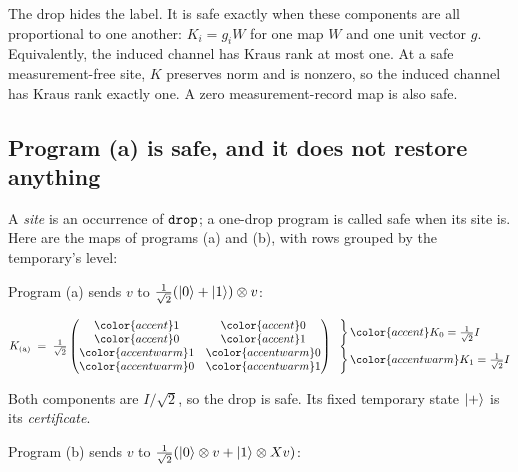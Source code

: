 \documentclass[acmsmall,screen,review,anonymous,nonacm]{acmart}
\begin{document}
The drop hides the label. It is safe exactly when these components are all
proportional to one another: $K_i=g_iW$ for one map $W$ and one unit
vector $g$.
Equivalently, the induced channel has Kraus rank at most one.
At a safe measurement-free site, $K$ preserves norm and is nonzero,
so the induced channel has Kraus rank exactly one. A zero measurement-record map is also safe.

\subsection{Program (a) is safe, and it does not restore anything}
A \emph{site} is an occurrence of $\texttt{drop}$; a one-drop program is called safe
when its site is. Here are the maps
of programs (a) and (b), with rows grouped by the temporary's level:
\begin{center}
\small
\begin{minipage}[t]{0.47\linewidth}
\raggedright
Program (a) sends $v$ to $\tfrac1{\sqrt2}(\lvert 0 \rangle + \lvert 1 \rangle) \otimes v$:
\par\smallskip\centerline{$
  K_{\mathrm{(a)}} \;=\; \tfrac1{\sqrt2}
  \begin{pmatrix}
    {\color{accent}1} & {\color{accent}0} \\
    {\color{accent}0} & {\color{accent}1} \\
    {\color{accentwarm}1} & {\color{accentwarm}0} \\
    {\color{accentwarm}0} & {\color{accentwarm}1}
  \end{pmatrix}
  \begin{array}{@{}l@{}}
    \left.\begin{matrix}\phantom{0}\\ \phantom{0}\end{matrix}\right\}
      {\color{accent}K_0 = \tfrac1{\sqrt2} I} \\
    \left.\begin{matrix}\phantom{0}\\ \phantom{0}\end{matrix}\right\}
      {\color{accentwarm}K_1 = \tfrac1{\sqrt2} I}
  \end{array}
$}\par\smallskip
Both components are $I/\sqrt2$, so the drop is safe. Its fixed temporary state
$\lvert + \rangle$ is its \emph{certificate}.
\end{minipage}\hfill
\begin{minipage}[t]{0.47\linewidth}
\raggedright
Program (b) sends $v$ to $\tfrac1{\sqrt2}(\lvert 0 \rangle \otimes v + \lvert 1 \rangle \otimes Xv)$:

\end{minipage}
\end{center}
\end{document}
